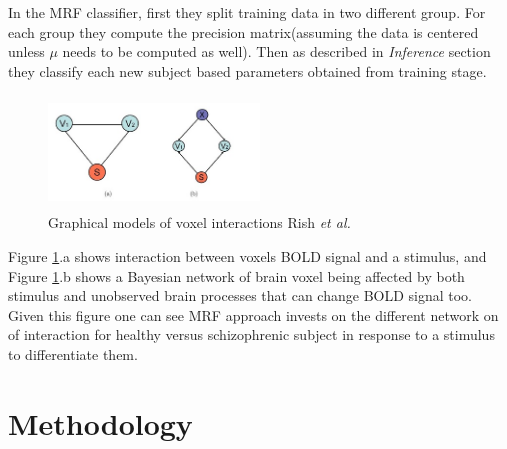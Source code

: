 \documentclass{article} %
\begin{document}
In the MRF classifier, first they split training data in two different group. For each group they compute the precision matrix(assuming the data is centered unless $\mu$ needs to be computed as well). Then as described in \textit{Inference} section they classify each new subject based parameters obtained from training stage.  \\

\begin{figure}

\begin{center}
\includegraphics[width=0.5\textwidth, height=3.0cm]{diagrams/voxel.jpg}
\caption{Graphical models of voxel interactions Rish \emph{et al.}}
\label{voxel}
\end{center}
\end{figure} 
Figure \ref{voxel}.a shows interaction between voxels BOLD signal and a stimulus, and Figure \ref{voxel}.b shows a Bayesian network of brain voxel being affected by both stimulus and unobserved brain processes that can change BOLD signal too. Given this figure one can see MRF approach invests on the different network on of interaction for healthy versus schizophrenic subject in response to a stimulus to differentiate them. 
    
\section{Methodology}
\end{document}
